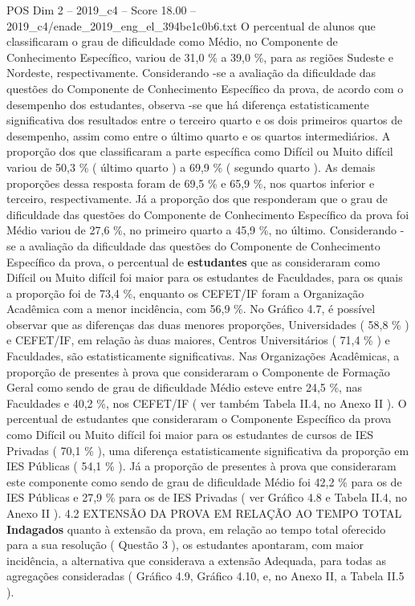 \begin{textsample}{POS Dim 2 – 2019\_c4 – Score 18.00 – 2019\_c4/enade\_2019\_eng\_el\_394be1c0b6.txt}
O percentual de alunos que classificaram o grau de dificuldade como Médio, no Componente de Conhecimento Específico, variou de 31,0 \% a 39,0 \%, para as regiões Sudeste e Nordeste, respectivamente.
Considerando -se a avaliação da dificuldade das questões do Componente de Conhecimento Específico da prova, de acordo com o desempenho dos estudantes, observa -se que há diferença estatisticamente significativa dos resultados entre o terceiro quarto e os dois primeiros quartos de desempenho, assim como entre o último quarto e os quartos intermediários.
A proporção dos que classificaram a parte específica como Difícil ou Muito difícil variou de 50,3 \% ( último quarto ) a 69,9 \% ( segundo quarto ).
As demais proporções dessa resposta foram de 69,5 \% e 65,9 \%, nos quartos inferior e terceiro, respectivamente.
Já a proporção dos que responderam que o grau de dificuldade das questões do Componente de Conhecimento Específico da prova foi Médio variou de 27,6 \%, no primeiro quarto a 45,9 \%, no último.
Considerando -se a avaliação da dificuldade das questões do Componente de Conhecimento Específico da prova, o percentual de \textbf{estudantes} que as consideraram como Difícil ou Muito difícil foi maior para os estudantes de Faculdades, para os quais a proporção foi de 73,4 \%, enquanto os CEFET/IF foram a Organização Acadêmica com a menor incidência, com 56,9 \%.
No Gráfico 4.7, é possível observar que as diferenças das duas menores proporções, Universidades ( 58,8 \% ) e CEFET/IF, em relação às duas maiores, Centros Universitários ( 71,4 \% ) e Faculdades, são estatisticamente significativas.
Nas Organizações Acadêmicas, a proporção de presentes à prova que consideraram o Componente de Formação Geral como sendo de grau de dificuldade Médio esteve entre 24,5 \%, nas Faculdades e 40,2 \%, nos CEFET/IF ( ver também Tabela II.4, no Anexo II ).
O percentual de estudantes que consideraram o Componente Específico da prova como Difícil ou Muito difícil foi maior para os estudantes de cursos de IES Privadas ( 70,1 \% ), uma diferença estatisticamente significativa da proporção em IES Públicas ( 54,1 \% ).
Já a proporção de presentes à prova que consideraram este componente como sendo de grau de dificuldade Médio foi 42,2 \% para os de IES Públicas e 27,9 \% para os de IES Privadas ( ver Gráfico 4.8 e Tabela II.4, no Anexo II ). 4.2 EXTENSÃO DA PROVA EM RELAÇÃO AO TEMPO TOTAL \textbf{Indagados} quanto à extensão da prova, em relação ao tempo total oferecido para a sua resolução ( Questão 3 ), os estudantes apontaram, com maior incidência, a alternativa que considerava a extensão Adequada, para todas as agregações consideradas ( Gráfico 4.9, Gráfico 4.10, e, no Anexo II, a Tabela II.5 ).

\end{textsample}
